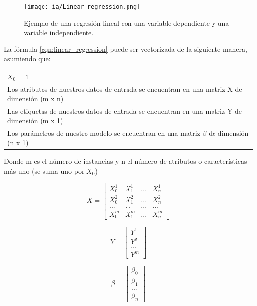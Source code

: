 \documentclass[11pt,fleqn]{book} %
\begin{document}
\begin{figure}[ht]
\centering\texttt{[image: ia/Linear regression.png]}
\caption{Ejemplo de una regresión lineal con una variable dependiente y una variable independiente.}

\label{fig:LinearRegression} 
\end{figure}

\FloatBarrier


La fórmula \ref{eqn:linear_regression} puede ser vectorizada de la siguiente manera, asumiendo que:

\begin{tabular}{l}
	$X_0 = 1$\\
	Los atributos de nuestros datos de entrada se encuentran en una matriz X de dimensión (m x n)\\
	Las etiquetas de nuestros datos de entrada se encuentran en una matriz Y de dimensión (m x 1)\\
	Los parámetros de nuestro modelo se encuentran en una matriz $\beta$ de dimensión (n x 1)\\
\end{tabular}

Donde m es el número de instancias y n el número de atributos o características más uno (se suma uno por $X_0$)


\begin{equation}
     X=\begin{bmatrix}
         X_{0}^{1} &   X_{1}^{1} & ...  &   X_{n}^{1} \\
         X_{0}^{2} &   X_{1}^{2} & ...  &   X_{n}^{2} \\
         ... &   ... & ...  &   ... \\
         X_{0}^{m} &   X_{1}^{m} & ...  &   X_{n}^{m} 
     \end{bmatrix}
\end{equation}
 
\begin{equation}
     Y=\begin{bmatrix}
         Y^{1}\\
         Y^{2}\\
         ...\\
         Y^{m}
        \end{bmatrix}
\end{equation}

\begin{equation}
     \beta=\begin{bmatrix}
         \beta_{0}\\
         \beta_{1}\\
         ...\\
         \beta_{n}
        \end{bmatrix}
\end{equation}
\end{document}
